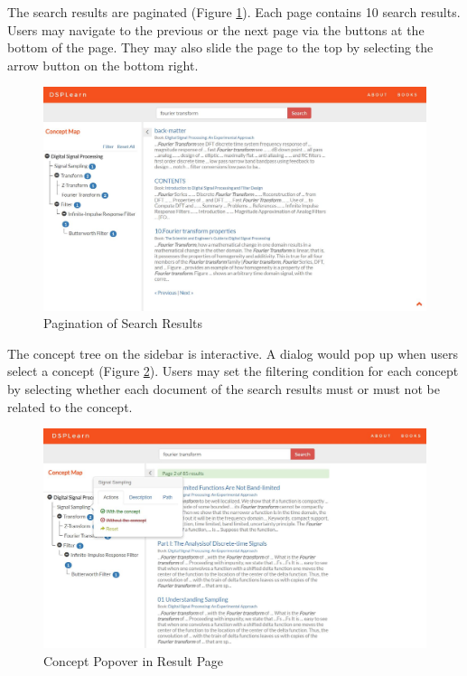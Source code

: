 The search results are paginated (Figure \ref{fig:result_paginate}). Each page contains 10 search results. Users may navigate to the previous or the next page via the buttons at the bottom of the page. They may also slide the page to the top by selecting the arrow button on the bottom right.

\begin{figure}[!htbp]
  \centering
  \includegraphics[width=\textwidth]{system_demonstration/demo_result_pagination.jpg}
  \caption{Pagination of Search Results}
  \label{fig:result_paginate}
\end{figure}

The concept tree on the sidebar is interactive. A dialog would pop up when users select a concept (Figure \ref{fig:result_popover}). Users may set the filtering condition for each concept by selecting whether each document of the search results must or must not be related to the concept.

\begin{figure}[!htbp]
  \centering
  \includegraphics[width=\textwidth]{system_demonstration/demo_result_popover.jpg}
  \caption{Concept Popover in Result Page}
  \label{fig:result_popover}
\end{figure}

